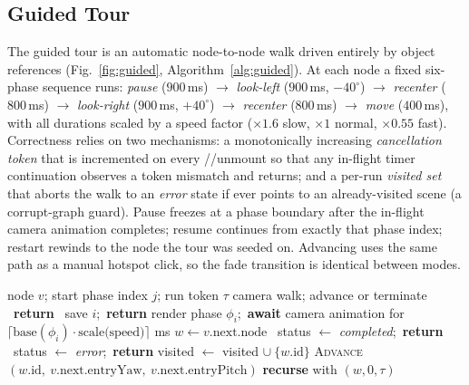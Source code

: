 \subsection{Guided Tour}
The guided tour is an automatic node-to-node walk driven entirely by
 object references (Fig.~\ref{fig:guided},
Algorithm~\ref{alg:guided}). At each node a fixed six-phase sequence runs:
\emph{pause} ($900$\,ms) $\to$ \emph{look-left} ($900$\,ms, $-40^{\circ}$)
$\to$ \emph{recenter} ($800$\,ms) $\to$ \emph{look-right} ($900$\,ms,
$+40^{\circ}$) $\to$ \emph{recenter} ($800$\,ms) $\to$ \emph{move}
($400$\,ms), with all durations scaled by a speed factor
($\times1.6$ slow, $\times1$ normal, $\times0.55$ fast). Correctness relies
on two mechanisms: a monotonically increasing \emph{cancellation token}
that is incremented on every //unmount so that any
in-flight timer continuation observes a token mismatch and returns; and a
per-run \emph{visited set} that aborts the walk to an \emph{error} state if
 ever points to an already-visited scene (a corrupt-graph
guard). Pause freezes at a phase boundary after the in-flight camera
animation completes; resume continues from exactly that phase index;
restart rewinds to the node the tour was seeded on. Advancing uses the same
 path as a manual hotspot click, so the fade transition is
identical between modes.

\begin{algorithm}[!t]
\caption{Guided Tour Execution at a Node}
\label{alg:guided}
\begin{algorithmic}[1]
\Require node $v$; start phase index $j$; run token $\tau$
\Ensure camera walk; advance or terminate
  \ \textbf{return}  \EndIf
  \ save $i$;\ \textbf{return} \EndIf
  \State render phase $\phi_i$;\ \textbf{await} camera animation for
         $\lceil \text{base}(\phi_i)\cdot \text{scale(speed)}\rceil$ ms
\EndFor
\State $w \gets v{.}\text{next.node}$
\ status $\gets$ \emph{completed};\ \textbf{return} \EndIf
{}\ status $\gets$ \emph{error};\ \textbf{return} \EndIf
\State visited $\gets$ visited $\cup\ \{w{.}\text{id}\}$
\State \textsc{Advance}$(w{.}\text{id},\ v{.}\text{next.entryYaw},\ v{.}\text{next.entryPitch})$
\State \textbf{recurse} with $(w, 0, \tau)$
\end{algorithmic}
\end{algorithm}

